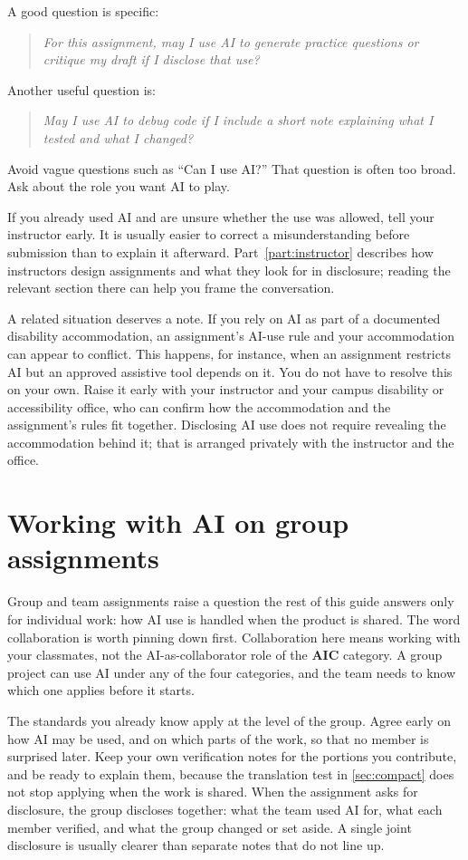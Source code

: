 \documentclass{SIAMbook2023}
\newcommand{\studentprompt}[1]{\begin{quote}\small\itshape #1\end{quote}}
\newcommand{\AIC}{\textcolor{catAIC}{\textbf{AIC}}}
\begin{document}
A good question is specific:

\studentprompt{For this assignment, may I use AI to generate practice questions or critique my draft if I disclose that use?}

Another useful question is:

\studentprompt{May I use AI to debug code if I include a short note explaining what I tested and what I changed?}

Avoid vague questions such as ``Can I use AI?'' That question is often too broad. Ask about the role you want AI to play.

If you already used AI and are unsure whether the use was allowed, tell your instructor early. It is usually easier to correct a misunderstanding before submission than to explain it afterward. Part~\ref{part:instructor} describes how instructors design assignments and what they look for in disclosure; reading the relevant section there can help you frame the conversation.

A related situation deserves a note. If you rely on AI as part of a documented disability accommodation, an assignment's AI-use rule and your accommodation can appear to conflict. This happens, for instance, when an assignment restricts AI but an approved assistive tool depends on it. You do not have to resolve this on your own. Raise it early with your instructor and your campus disability or accessibility office, who can confirm how the accommodation and the assignment's rules fit together. Disclosing AI use does not require revealing the accommodation behind it; that is arranged privately with the instructor and the office.

\section{Working with AI on group assignments}
\label{sec:group-assignments}%

Group and team assignments raise a question the rest of this guide answers only for individual work: how AI use is handled when the product is shared. The word collaboration is worth pinning down first. Collaboration here means working with your classmates, not the AI-as-collaborator role of the \AIC{} category. A group project can use AI under any of the four categories, and the team needs to know which one applies before it starts.

The standards you already know apply at the level of the group. Agree early on how AI may be used, and on which parts of the work, so that no member is surprised later. Keep your own verification notes for the portions you contribute, and be ready to explain them, because the translation test in \cref{sec:compact} does not stop applying when the work is shared. When the assignment asks for disclosure, the group discloses together: what the team used AI for, what each member verified, and what the group changed or set aside. A single joint disclosure is usually clearer than separate notes that do not line up.
\end{document}
